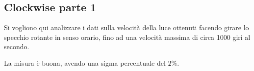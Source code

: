 \subsection{Clockwise parte 1}
Si vogliono qui analizzare i dati sulla velocità della luce ottenuti facendo girare lo specchio rotante in senso orario, fino ad una velocità massima di circa 1000 giri al secondo. 

La misura è buona, avendo una sigma percentuale del $2\%$.
